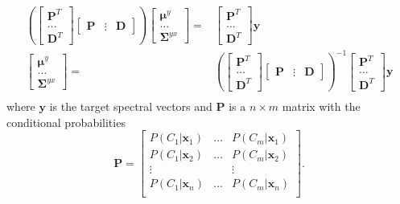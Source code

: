 \begin{equation}
	\label{eq:param_computed}
	\begin{split}
		\left( 
		\begin{bmatrix}
			\mathbf{P}^T \\
			\dots \\
			\mathbf{D}^T
		\end{bmatrix}
		\begin{bmatrix}
			\mathbf{P} & \vdots & \mathbf{D}
		\end{bmatrix}
		 \right)
		\begin{bmatrix}
			\boldsymbol{\mu}^y \\
			\dots \\
			\mathbf{\Sigma}^{yx}
		\end{bmatrix}
		= &
		\begin{bmatrix}
			\mathbf{P}^T \\
			\dots \\
			\mathbf{D}^T
		\end{bmatrix}
		\mathbf{y} \\ %
		\begin{bmatrix}
			\boldsymbol{\mu}^y \\
			\dots \\
			\mathbf{\Sigma}^{yx}
		\end{bmatrix}
		= &
		\left( 
		\begin{bmatrix}
			\mathbf{P}^T \\
			\dots \\
			\mathbf{D}^T
		\end{bmatrix}
		\begin{bmatrix}
			\mathbf{P} & \vdots & \mathbf{D}
		\end{bmatrix}
		 \right)^{-1}
		\begin{bmatrix}
			\mathbf{P}^T \\
			\dots \\
			\mathbf{D}^T
		\end{bmatrix}
		\mathbf{y} \\ %
	\end{split}
\end{equation}
where $\mathbf{y}$ is the target spectral vectors and $\mathbf{P}$ is a $n \times m$ matrix with the conditional probabilities
\begin{equation}
	\label{eq:P_matrix}
	\mathbf{P} = \begin{bmatrix}
		P(C_1\vert \mathbf{x}_1) & \dots & P(C_m\vert \mathbf{x}_1) \\
		P(C_1\vert \mathbf{x}_2) & \dots & P(C_m\vert \mathbf{x}_2) \\
		\vdots & & \vdots \\
		P(C_1\vert \mathbf{x}_n) & \dots & P(C_m\vert \mathbf{x}_n) \\
	\end{bmatrix}.
\end{equation}
